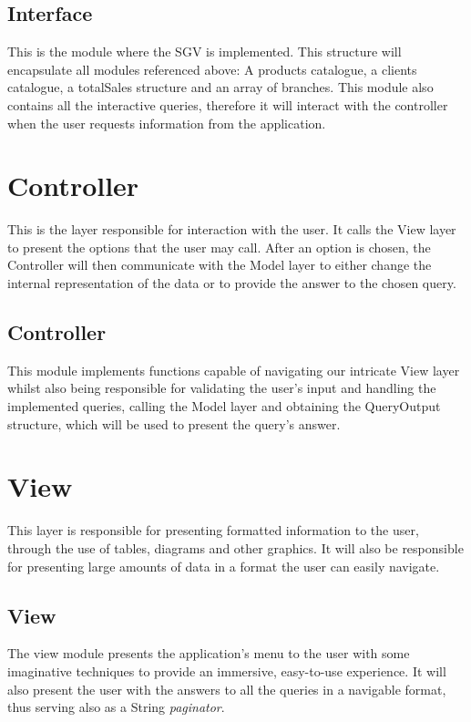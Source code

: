 \documentclass[a4paper]{report}
\begin{document}
\subsection{Interface}

This is the module where the SGV is implemented. This structure will encapsulate all modules referenced above:
A products catalogue, a clients catalogue, a totalSales structure and an array of branches.
This module also contains all the interactive queries, therefore it will interact with the controller when the user requests information from the application.


\section{Controller}

This is the layer responsible for interaction with the user. It calls the View layer to present the options that the user may call. 
After an option is chosen, the Controller will then communicate with the Model layer to either change the internal
representation of the data or to provide the answer to the chosen query.

\subsection{Controller}
This module implements functions capable of navigating our intricate View layer whilst also being responsible for validating the user’s input and handling the implemented queries, calling the  Model layer and obtaining the QueryOutput structure, which will be  used to present the query’s answer.

\section{View}
This layer is responsible for presenting formatted information to the user, through the 
use of tables, diagrams and other graphics. It will also be responsible for presenting large amounts of data in a format the user can easily navigate.

\subsection{View}

The view module presents the application's menu to the user with some imaginative techniques to provide an immersive, easy-to-use experience.
It will also present the user with the answers to all the queries in a navigable format, thus serving also as 
a String \textit{paginator}.
\end{document}
